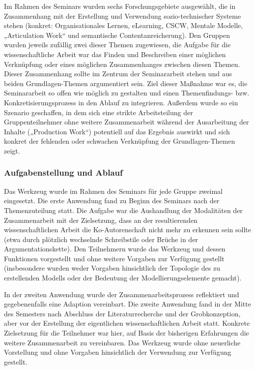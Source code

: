 Im Rahmen des Seminars wurden sechs Forschungsgebiete ausgewählt, die in Zusammenhang mit der Erstellung und Verwendung sozio-technischer Systeme stehen (konkret: Organisationales Lernen, eLearning, \gls{CSCW}, Mentale Modelle, „Articulation Work“ und semantische Contentanreicherung). Den Gruppen wurden jeweils zufällig zwei dieser Themen zugewiesen, die Aufgabe für die wissenschaftliche Arbeit war das Finden und Beschreiben einer möglichen Verknüpfung oder eines möglichen Zusammenhanges zwischen diesen Themen. Dieser Zusammenhang sollte im Zentrum der Seminararbeit stehen und aus beiden Grundlagen-Themen argumentiert sein. Ziel dieser Maßnahme war es, die Seminararbeit so offen wie möglich zu gestalten und einen Themenfindungs- bzw. Konkretisierungsprozess in den Ablauf zu integrieren. Außerdem wurde so ein Szenario geschaffen, in dem sich eine strikte Arbeitsteilung der Gruppenteilnehmer ohne weitere Zusammenarbeit während der Ausarbeitung der Inhalte („Production Work“) potentiell auf das Ergebnis auswirkt und sich konkret der fehlenden oder schwachen Verknüpfung der Grundlagen-Themen zeigt.


\subsubsection{Aufgabenstellung und Ablauf} %
\label{ssub:2_aufgabenstellung}

Das Werkzeug wurde im Rahmen des Seminars für jede Gruppe zweimal eingesetzt. Die erste Anwendung fand zu Beginn des Seminars nach der Themenzuteilung statt. Die Aufgabe war die Aushandlung der Modalitäten der Zusammenarbeit mit der Zielsetzung, dass an der resultierenden wissenschaftlichen Arbeit die Ko-Autorenschaft nicht mehr zu erkennen sein sollte (etwa durch plötzlich wechselnde Schreibstile oder Brüche in der Argumentationskette). Den Teilnehmern wurde das Werkzeug und dessen Funktionen vorgestellt und ohne weitere Vorgaben zur Verfügung gestellt (insbesondere wurden weder Vorgaben hinsichtlich der Topologie des zu erstellenden Modells oder der Bedeutung der Modellierungselemente gemacht).

In der zweiten Anwendung wurde der Zusammenarbeitsprozess reflektiert und gegebenenfalls eine Adaption vereinbart. Die zweite Anwendung fand in der Mitte des Semesters nach Abschluss der Literaturrecherche und der Grobkonzeption, aber vor der Erstellung der eigentlichen wissenschaftlichen Arbeit statt. Konkrete Zielsetzung für die Teilnehmer war hier, auf Basis der bisherigen Erfahrungen die weitere Zusammenarbeit zu vereinbaren. Das Werkzeug wurde ohne neuerliche Vorstellung und ohne Vorgaben hinsichtlich der Verwendung zur Verfügung gestellt.

